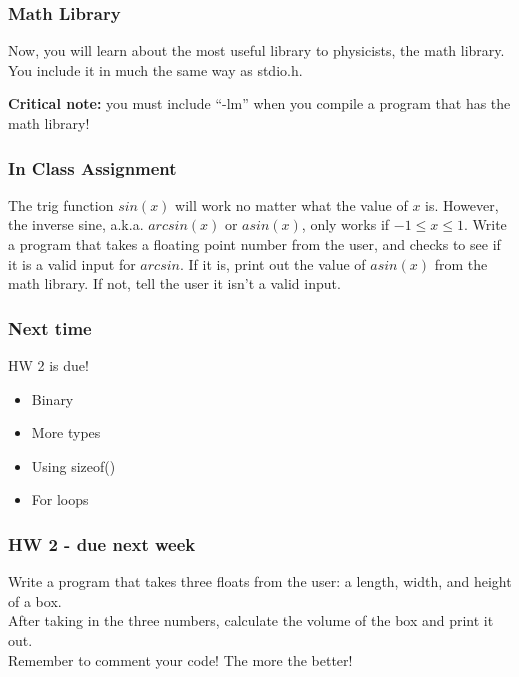 \documentclass{beamer}
\begin{document}
\begin{frame}
  \frametitle{Math Library}
  Now, you will learn about the most useful library to physicists, 
  the math library.\\
  You include it in much the same way as stdio.h.
  
  \textbf{Critical note:} you must include ``-lm'' when you compile a program 
  that has the math library!
\end{frame}

\begin{frame}[fragile]
  \frametitle{In Class Assignment}
  The trig function $sin(x)$ will work no matter what the value of $x$ is.
  However, the inverse sine, a.k.a. $arcsin(x)$ or $asin(x)$, only works 
  if $-1\le x\le1 $. Write a program
  that takes a floating point number from the user, and checks to see if it is
  a valid input for $arcsin$. If it is, print out the value of
  $asin(x)$ from the math library. 
  If not, tell the user it isn't a valid input.
\end{frame}

\begin{frame}
  \frametitle{Next time}
  HW 2 is due!
  \begin{itemize}
    \item Binary
    \item More types
    \item Using sizeof()
    \item For loops
  \end{itemize}
\end{frame}

\begin{frame}
  \frametitle{HW 2 - due next week}
  Write a program that takes three floats from the user: a length, width, and height of a box.\\
  After taking in the three numbers, calculate the volume of the box and print it out.\\
  Remember to comment your code! The more the better!
\end{frame}
\end{document}
